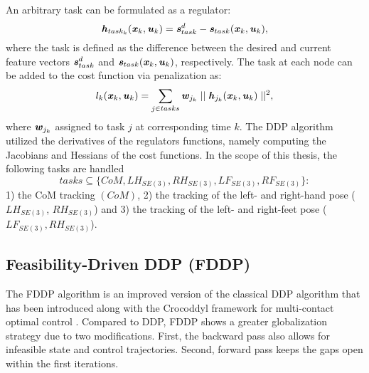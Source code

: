An arbitrary task can be formulated as a regulator: 
\begin{equation*} 
\bm{\mathit{h}}_{task_k}(\bm{\mathit{x}}_k,\bm{\mathit{u}}_k)=\bm{\mathit{s}}_{task}^d-\bm{\mathit{s}}_{task}(\bm{\mathit{x}}_k,\bm{\mathit{u}}_k),
\end{equation*}   
where the task is defined as the difference between the desired and current feature vectors $\bm{\mathit{s}}_{task}^d$ and $\bm{\mathit{s}}_{task}(\bm{\mathit{x}}_k,\bm{\mathit{u}}_k)$, respectively. The task at each node can be added to the cost function via penalization as: 
\begin{equation*} 
l_k(\bm{\mathit{x}}_k,\bm{\mathit{u}}_k)=\sum_{j\in tasks}\bm{\mathit{w}}_{j_k}\mid\mid\bm{\mathit{h}}_{j_k}(\bm{\mathit{x}}_k,\bm{\mathit{u}}_k)\mid\mid^2,
\end{equation*}  
where $\bm{\mathit{w}}_{j_k}$ assigned to task $j$ at corresponding time $k$. The \gls{DDP} algorithm utilized the derivatives of the regulators functions, namely computing the Jacobians and Hessians of the cost functions. 
In the scope of this thesis, the following tasks are handled
\begin{equation}
tasks \subseteq \{CoM, LH_{SE(3)}, RH_{SE(3)}, LF_{SE(3)}, RF_{SE(3)}\}:
\end{equation}
1) the \gls{CoM} tracking $(CoM)$, 2) the tracking of the left- and right-hand pose ($LH_{SE(3)}$, $RH_{SE(3)}$) and 3) the tracking of the left- and right-feet pose ($LF_{SE(3)}, RH_{SE(3)}$).

\subsection{Feasibility-Driven DDP (FDDP)}
The \gls{FDDP} algorithm is an improved version of the classical \gls{DDP} algorithm that has been introduced along with the Crocoddyl framework for multi-contact optimal control \cite{mastalli20crocoddyl}.
Compared to \gls{DDP}, \gls{FDDP} shows a greater globalization strategy due to two modifications. First, the backward pass also allows for infeasible state and control trajectories. Second, forward pass keeps the gaps open within the first iterations. 